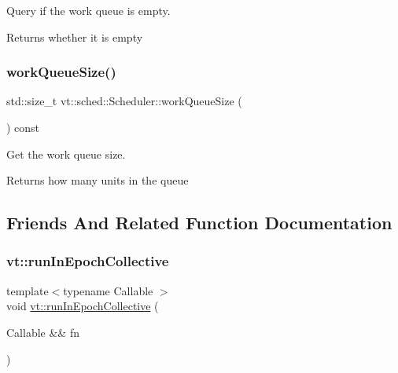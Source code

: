 Query if the work queue is empty. 

\begin{DoxyReturn}{Returns}
whether it is empty 
\end{DoxyReturn}
\mbox{\label{structvt_1_1sched_1_1_scheduler_a6ee315ffd90f37a277bb2b5622af1f4f}} 
\subsubsection{\texorpdfstring{work\+Queue\+Size()}{workQueueSize()}}
{\footnotesize\ttfamily std\+::size\+\_\+t vt\+::sched\+::\+Scheduler\+::work\+Queue\+Size (\begin{DoxyParamCaption}{ }\end{DoxyParamCaption}) const\hspace{0.3cm}{\ttfamily [inline]}}



Get the work queue size. 

\begin{DoxyReturn}{Returns}
how many units in the queue 
\end{DoxyReturn}


\subsection{Friends And Related Function Documentation}
\mbox{\label{structvt_1_1sched_1_1_scheduler_a71bf858d697b14435f4b7e525d2dffde}} 
\subsubsection{\texorpdfstring{vt\+::run\+In\+Epoch\+Collective}{vt::runInEpochCollective}}
{\footnotesize\ttfamily template$<$typename Callable $>$ \\
void \hyperlink{namespacevt_a2fc4ef34f30b49a1781d765804bfadbb}{vt\+::run\+In\+Epoch\+Collective} (\begin{DoxyParamCaption}\item[{Callable \&\&}]{fn }\end{DoxyParamCaption})\hspace{0.3cm}{\ttfamily [friend]}}

